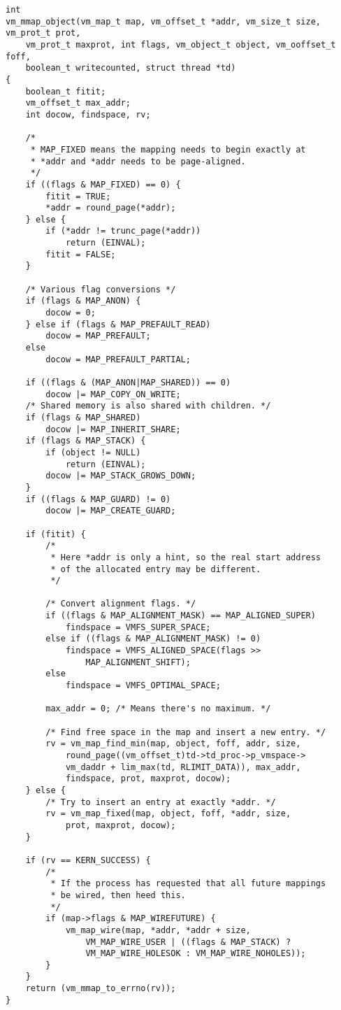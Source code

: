 \documentclass[shortabstract, english]{iithesis}
\newenvironment{code}{}{}
\begin{document}
\begin{code}
\begin{verbatim}
int
vm_mmap_object(vm_map_t map, vm_offset_t *addr, vm_size_t size, vm_prot_t prot,
    vm_prot_t maxprot, int flags, vm_object_t object, vm_ooffset_t foff,
    boolean_t writecounted, struct thread *td)
{
    boolean_t fitit;
    vm_offset_t max_addr;
    int docow, findspace, rv;

    /*
     * MAP_FIXED means the mapping needs to begin exactly at
     * *addr and *addr needs to be page-aligned.
     */
    if ((flags & MAP_FIXED) == 0) {
        fitit = TRUE;
        *addr = round_page(*addr);
    } else {
        if (*addr != trunc_page(*addr))
            return (EINVAL);
        fitit = FALSE;
    }

    /* Various flag conversions */
    if (flags & MAP_ANON) {
        docow = 0;
    } else if (flags & MAP_PREFAULT_READ)
        docow = MAP_PREFAULT;
    else
        docow = MAP_PREFAULT_PARTIAL;

    if ((flags & (MAP_ANON|MAP_SHARED)) == 0)
        docow |= MAP_COPY_ON_WRITE;
    /* Shared memory is also shared with children. */
    if (flags & MAP_SHARED)
        docow |= MAP_INHERIT_SHARE;
    if (flags & MAP_STACK) {
        if (object != NULL)
            return (EINVAL);
        docow |= MAP_STACK_GROWS_DOWN;
    }
    if ((flags & MAP_GUARD) != 0)
        docow |= MAP_CREATE_GUARD;

    if (fitit) {
        /*
         * Here *addr is only a hint, so the real start address
         * of the allocated entry may be different.
         */

        /* Convert alignment flags. */
        if ((flags & MAP_ALIGNMENT_MASK) == MAP_ALIGNED_SUPER)
            findspace = VMFS_SUPER_SPACE;
        else if ((flags & MAP_ALIGNMENT_MASK) != 0)
            findspace = VMFS_ALIGNED_SPACE(flags >>
                MAP_ALIGNMENT_SHIFT);
        else
            findspace = VMFS_OPTIMAL_SPACE;

        max_addr = 0; /* Means there's no maximum. */

        /* Find free space in the map and insert a new entry. */
        rv = vm_map_find_min(map, object, foff, addr, size,
            round_page((vm_offset_t)td->td_proc->p_vmspace->
            vm_daddr + lim_max(td, RLIMIT_DATA)), max_addr,
            findspace, prot, maxprot, docow);
    } else {
        /* Try to insert an entry at exactly *addr. */
        rv = vm_map_fixed(map, object, foff, *addr, size,
            prot, maxprot, docow);
    }

    if (rv == KERN_SUCCESS) {
        /*
         * If the process has requested that all future mappings
         * be wired, then heed this.
         */
        if (map->flags & MAP_WIREFUTURE) {
            vm_map_wire(map, *addr, *addr + size,
                VM_MAP_WIRE_USER | ((flags & MAP_STACK) ?
                VM_MAP_WIRE_HOLESOK : VM_MAP_WIRE_NOHOLES));
        }
    }
    return (vm_mmap_to_errno(rv));
}
\end{verbatim}
\end{code}
\end{document}
